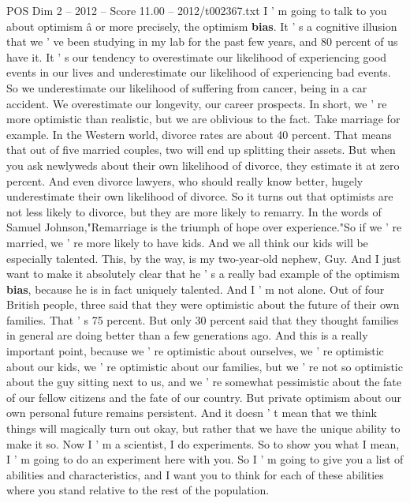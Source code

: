 \begin{textsample}{POS Dim 2 – 2012 – Score 11.00 – 2012/t002367.txt}  \label{ex:f2_pos_072}
I ' m going to talk to you about optimism â or more precisely, the optimism \textbf{bias}.
It ' s a cognitive illusion that we ' ve been studying in my lab for the past few years, and 80 percent of us have it.
It ' s our tendency to overestimate our likelihood of experiencing good events in our lives and underestimate our likelihood of experiencing bad events.
So we underestimate our likelihood of suffering from cancer, being in a car accident.
We overestimate our longevity, our career prospects.
In short, we ' re more optimistic than realistic, but we are oblivious to the fact.
Take marriage for example.
In the Western world, divorce rates are about 40 percent.
That means that out of five married couples, two will end up splitting their assets.
But when you ask newlyweds about their own likelihood of divorce, they estimate it at zero percent.
And even divorce lawyers, who should really know better, hugely underestimate their own likelihood of divorce.
So it turns out that optimists are not less likely to divorce, but they are more likely to remarry.
In the words of Samuel Johnson,"Remarriage is the triumph of hope over experience."So if we ' re married, we ' re more likely to have kids.
And we all think our kids will be especially talented.
This, by the way, is my two-year-old nephew, Guy.
And I just want to make it absolutely clear that he ' s a really bad example of the optimism \textbf{bias}, because he is in fact uniquely talented.
And I ' m not alone.
Out of four British people, three said that they were optimistic about the future of their own families.
That ' s 75 percent.
But only 30 percent said that they thought families in general are doing better than a few generations ago.
And this is a really important point, because we ' re optimistic about ourselves, we ' re optimistic about our kids, we ' re optimistic about our families, but we ' re not so optimistic about the guy sitting next to us, and we ' re somewhat pessimistic about the fate of our fellow citizens and the fate of our country.
But private optimism about our own personal future remains persistent.
And it doesn ' t mean that we think things will magically turn out okay, but rather that we have the unique ability to make it so.
Now I ' m a scientist, I do experiments.
So to show you what I mean, I ' m going to do an experiment here with you.
So I ' m going to give you a list of abilities and characteristics, and I want you to think for each of these abilities where you stand relative to the rest of the population.

\end{textsample}
